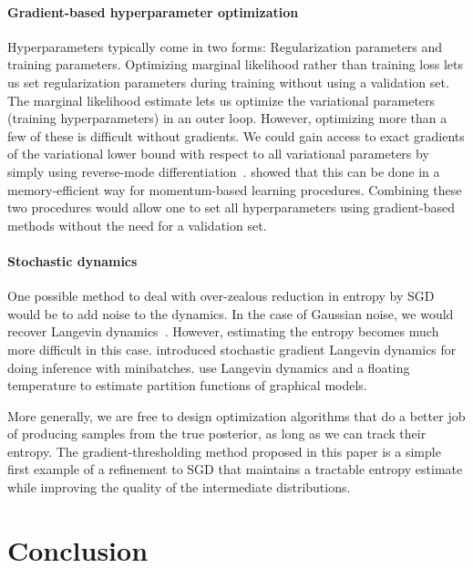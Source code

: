 \documentclass[]{article}
\begin{document}

\paragraph{Gradient-based hyperparameter optimization}
Hyperparameters typically come in two forms:
Regularization parameters and training parameters.
Optimizing marginal likelihood rather than training loss lets us set regularization parameters during training without using a validation set.
The marginal likelihood estimate lets us optimize the variational parameters (training hyperparameters) in an outer loop.
However, optimizing more than a few of these is difficult without gradients.
We could gain access to exact gradients of the variational lower bound with respect to all variational parameters by simply using reverse-mode differentiation~\citep{domke2012generic}.
\citet{MacDuvAda2015hyper} showed that this can be done in a memory-efficient way for momentum-based learning procedures.
Combining these two procedures would allow one to set all hyperparameters using gradient-based methods without the need for a validation set.

\paragraph{Stochastic dynamics}
One possible method to deal with over-zealous reduction in entropy by SGD would be to add noise to the dynamics.
In the case of Gaussian noise, we would recover Langevin dynamics~\citep{neal2011mcmc}.
However, estimating the entropy becomes much more difficult in this case.
\citet{welling2011bayesian} introduced stochastic gradient Langevin dynamics for doing inference with minibatches.
\citet{ma2013estimating} use Langevin dynamics and a floating temperature to estimate partition functions of graphical models.

More generally, we are free to design optimization algorithms that do a better job of producing samples from the true posterior, as long as we can track their entropy.
The gradient-thresholding method proposed in this paper is a simple first example of a refinement to SGD that maintains a tractable entropy estimate while improving the quality of the intermediate distributions.

\section{Conclusion}
\end{document}
